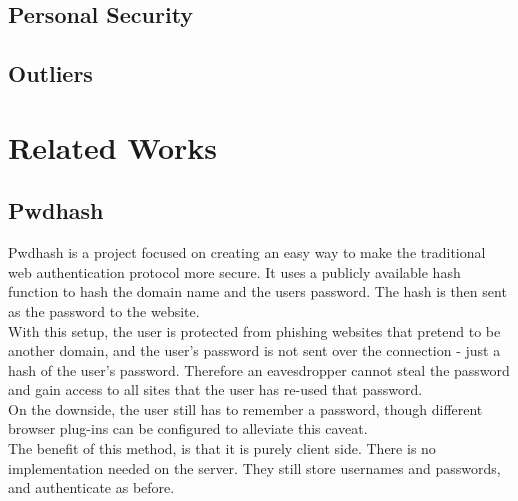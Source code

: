 \documentclass[11pt]{article}
\begin{document}
\subsection{Personal Security} \label{subsec:personalsecurity}

\subsection{Outliers} \label{subsec:outliers}

\section{Related Works} \label{sec:relatedWorks}
\subsection{Pwdhash}  \label{subsec:pwdhash}
Pwdhash\cite{pwdhash} is a project focused on creating an easy way to make the traditional web authentication protocol more secure. It uses a publicly available hash function to hash the domain name and the users password. The hash is then sent as the password to the website.\\
	With this setup, the user is protected from phishing websites that pretend to be another domain, and the user’s password is not sent over the connection - just a hash of the user's password. Therefore an eavesdropper cannot steal the password and gain access to all sites that the user has re-used that password.\\
	On the downside, the user still has to remember a password, though different browser plug-ins can be configured to alleviate this caveat.\\
The benefit of this method, is that it is purely client side. There is no implementation needed on the server. They still store usernames and passwords, and authenticate as before.
\end{document}
